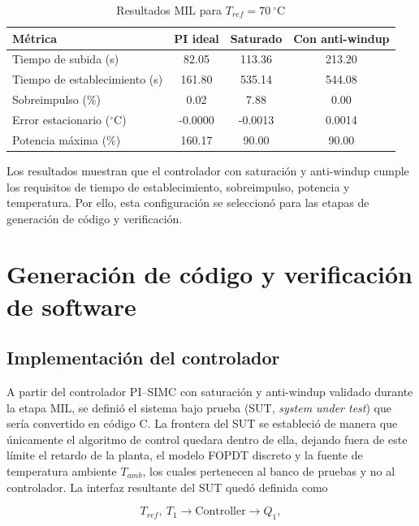 \documentclass[journal]{IEEEtran}
\begin{document}
\begin{table}[H]
        \centering
        \caption{Resultados MIL para $T_{ref}=70~^\circ$C}
        \label{tab:mil_70_v2}
        \renewcommand{\arraystretch}{1.3}
        \begin{tabularx}{\columnwidth}{@{}Yccc@{}}
        \toprule
                \textbf{Métrica} & \textbf{PI ideal} & \textbf{Saturado} & \textbf{Con anti-windup} \\
                \midrule
                Tiempo de subida (s) & 82.05 & 113.36 & 213.20 \\
                Tiempo de establecimiento (s) & 161.80 & 535.14 & 544.08 \\
                Sobreimpulso (\%) & 0.02 & 7.88 & 0.00 \\
                Error estacionario ($^\circ$C) & -0.0000 & -0.0013 & 0.0014 \\
                Potencia máxima (\%) & 160.17 & 90.00 & 90.00 \\
                \bottomrule
        \end{tabularx}
\end{table}

Los resultados muestran que el controlador con saturación y anti-windup
cumple los requisitos de tiempo de establecimiento, sobreimpulso, potencia y
temperatura. Por ello, esta configuración se seleccionó para las etapas de
generación de código y verificación.


\section{Generación de código y verificación de software}
\subsection{Implementación del controlador}
A partir del controlador PI--SIMC con saturación y anti-windup validado durante la
etapa MIL, se definió el sistema bajo prueba (SUT, \textit{system under test}) que
sería convertido en código C. La frontera del SUT se estableció de manera que
únicamente el algoritmo de control quedara dentro de ella, dejando fuera de este
límite el retardo de la planta, el modelo FOPDT discreto y la fuente de temperatura
ambiente $T_{amb}$, los cuales pertenecen al banco de pruebas y no al controlador.
La interfaz resultante del SUT quedó definida como

\begin{equation}
        T_{ref},\ T_1 \longrightarrow \text{Controller} \longrightarrow Q_1,
\label{eq:interfaz_SUT}
\end{equation}
\end{document}
